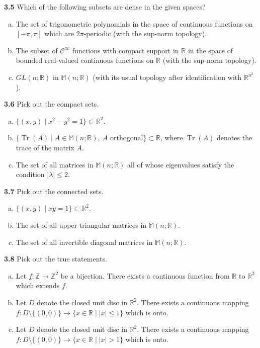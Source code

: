\documentclass[11pt,a4paper]{article}
\newcommand{\Z}{\mathbb{Z}}
\newcommand{\R}{\mathbb{R}}
\newcommand{\M}{\mathbb{M}}
\newcommand{\qitem}[1]{\par\medskip\noindent\textbf{#1}\hspace{0.5em}}
\begin{document}
\qitem{3.5} Which of the following subsets are dense in the given spaces?
\begin{enumerate}[a.]
  \item The set of trigonometric polynomials in the space of continuous functions on $[-\pi, \pi]$ which are $2\pi$-periodic (with the sup-norm topology).
  \item The subset of $\mathcal{C}^\infty$ functions with compact support in $\R$ in the space of bounded real-valued continuous functions on $\R$ (with the sup-norm topology).
  \item $GL(n; \R)$ in $\M(n; \R)$ (with its usual topology after identification with $\R^{n^2}$).
\end{enumerate}

\qitem{3.6} Pick out the compact sets.
\begin{enumerate}[a.]
  \item $\{(x, y) \mid x^2 - y^2 = 1\} \subset \R^2$.
  \item $\{\operatorname{Tr}(A) \mid A \in \M(n; \R),\ A \text{ orthogonal}\} \subset \R$, where $\operatorname{Tr}(A)$ denotes the trace of the matrix $A$.
  \item The set of all matrices in $\M(n; \R)$ all of whose eigenvalues satisfy the condition $|\lambda| \le 2$.
\end{enumerate}

\qitem{3.7} Pick out the connected sets.
\begin{enumerate}[a.]
  \item $\{(x, y) \mid xy = 1\} \subset \R^2$.
  \item The set of all upper triangular matrices in $\M(n; \R)$.
  \item The set of all invertible diagonal matrices in $\M(n; \R)$.
\end{enumerate}

\qitem{3.8} Pick out the true statements.
\begin{enumerate}[a.]
  \item Let $f : \Z \to \Z^2$ be a bijection. There exists a continuous function from $\R$ to $\R^2$ which extends $f$.
  \item Let $D$ denote the closed unit disc in $\R^2$. There exists a continuous mapping $f : D \setminus \{(0, 0)\} \to \{x \in \R \mid |x| \le 1\}$ which is onto.
  \item Let $D$ denote the closed unit disc in $\R^2$. There exists a continuous mapping $f : D \setminus \{(0, 0)\} \to \{x \in \R \mid |x| > 1\}$ which is onto.
\end{enumerate}
\end{document}
